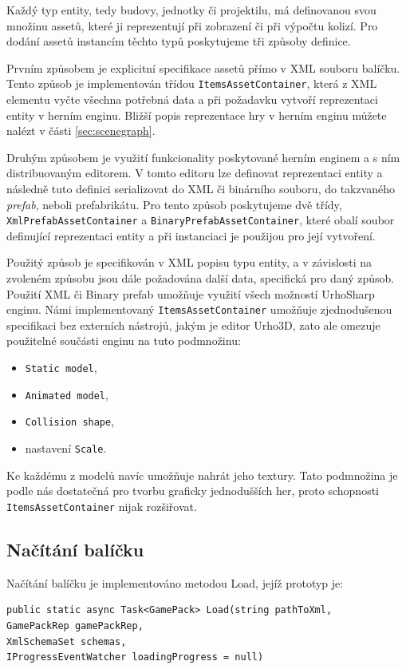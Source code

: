 Každý typ entity, tedy budovy, jednotky či projektilu, má definovanou svou množinu assetů, které ji reprezentují při zobrazení či při výpočtu kolizí. Pro dodání assetů instancím těchto typů poskytujeme tři způsoby definice.

Prvním způsobem je explicitní specifikace assetů přímo v XML souboru balíčku. Tento způsob je implementován třídou \texttt{ItemsAssetContainer}, která z XML elementu vyčte všechna potřebná data a při požadavku vytvoří reprezentaci entity v herním enginu. Bližší popis reprezentace hry v herním enginu můžete nalézt v části \ref{sec:scenegraph}.

Druhým způsobem je využití funkcionality poskytované herním enginem a s ním distribuovaným editorem. V tomto editoru lze definovat reprezentaci entity a následně tuto definici serializovat do XML či binárního souboru, do takzvaného \textit{prefab}, neboli prefabrikátu. Pro tento způsob poskytujeme dvě třídy, \texttt{XmlPrefabAssetContainer} a \texttt{BinaryPrefabAssetContainer}, které obalí soubor definující reprezentaci entity a při instanciaci je použijou pro její vytvoření.

Použitý způsob je specifikován v XML popisu typu entity, a v závislosti na zvoleném způsobu jsou dále požadována další data, specifická pro daný způsob. Použití XML či Binary prefab umožňuje využití všech možností UrhoSharp enginu. Námi implementovaný \texttt{ItemsAssetContainer} umožňuje zjednodušenou specifikaci bez externích nástrojů, jakým je editor Urho3D, zato ale omezuje použitelné součásti enginu na tuto podmnožinu:

\begin{itemize}
	\item \texttt{Static model},
	\item \texttt{Animated model},
	\item \texttt{Collision shape},
	\item nastavení \texttt{Scale}.
\end{itemize}

Ke každému z modelů navíc umožňuje nahrát jeho textury. Tato podmnožina je podle nás dostatečná pro tvorbu graficky jednodušších her, proto schopnosti \texttt{ItemsAssetContainer} nijak rozšiřovat.

\subsection{Načítání balíčku}

Načítání balíčku je implementováno metodou Load, jejíž prototyp je:
\begin{lstlisting}
public static async Task<GamePack> Load(string pathToXml,
GamePackRep gamePackRep,
XmlSchemaSet schemas,
IProgressEventWatcher loadingProgress = null)
\end{lstlisting}

